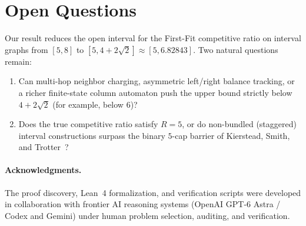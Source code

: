 \documentclass[11pt,a4paper]{article}
\theoremstyle{remark}
\begin{document}
\section{Open Questions}

Our result reduces the open interval for the First-Fit competitive ratio on interval graphs from $[5, 8]$ to $[5, 4 + 2\sqrt{2}] \approx [5, 6.82843]$. Two natural questions remain:
\begin{enumerate}
  \item Can multi-hop neighbor charging, asymmetric left/right balance tracking, or a richer finite-state column automaton push the upper bound strictly below $4 + 2\sqrt{2}$ (for example, below $6$)?
  \item Does the true competitive ratio satisfy $R = 5$, or do non-bundled (staggered) interval constructions surpass the binary $5$-cap barrier of Kierstead, Smith, and Trotter~\cite{kst16}?
\end{enumerate}

\paragraph{Acknowledgments.}
The proof discovery, Lean~4 formalization, and verification scripts were developed in collaboration with frontier AI reasoning systems (OpenAI GPT-6 Astra / Codex and Gemini) under human problem selection, auditing, and verification.
\end{document}
